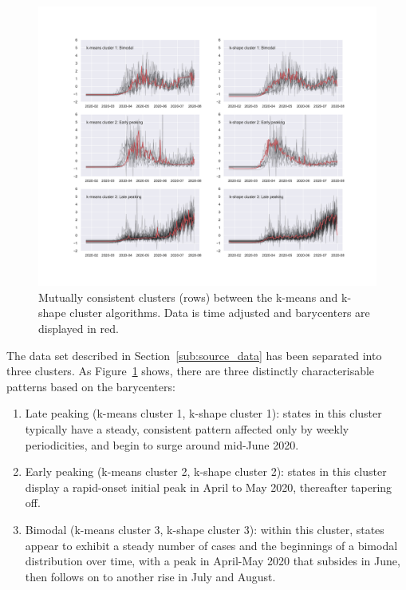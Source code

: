 \documentclass{article}
\begin{document}
\begin{figure}
	\includegraphics[width=\linewidth]{figures/side-by-side}
	\centering
	\caption{Mutually consistent clusters (rows) between the k-means and k-shape cluster algorithms. Data is time adjusted and barycenters are displayed in red.}
	\label{fig:side-by-side}
\end{figure}

The data set described in Section~\ref{sub:source_data} has been separated into three clusters. As Figure~\ref{fig:side-by-side} shows, there are three distinctly characterisable patterns based on the barycenters:

\begin{enumerate}
	\item Late peaking (k-means cluster 1, k-shape cluster 1): states in this cluster typically have a steady, consistent pattern affected only by weekly periodicities, and begin to surge around mid-June 2020.
	\item Early peaking (k-means cluster 2, k-shape cluster 2): states in this cluster display a rapid-onset initial peak in April to May 2020, thereafter tapering off. 
	\item Bimodal (k-means cluster 3, k-shape cluster 3): within this cluster, states appear to exhibit a steady number of cases and the beginnings of a bimodal distribution over time, with a peak in April-May 2020 that subsides in June, then follows on to another rise in July and August.
\end{enumerate}
\end{document}
